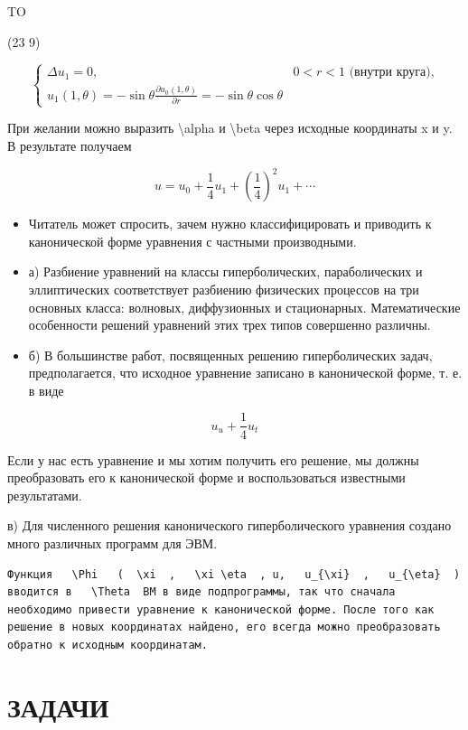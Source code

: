 \documentclass[
]{article}
\begin{document}
TO

(23 9)

\[
\begin{cases} \Delta u_{1} = 0, & 0 < r < 1 \text{ (внутри круга),} \\ u_{1}(1, \theta) = -\sin \theta \frac{\partial u_{0}(1, \theta)}{\partial r} = -\sin \theta \cos \theta \end{cases}
\]

При желании можно выразить \textbackslash alpha и \textbackslash beta
через исходные координаты x и y. В результате получаем

\[
u = u_0 + \frac{1}{4}u_1 + \left(\frac{1}{4}\right)^2 u_1 + \cdots
\]

\begin{itemize}
\item
  Читатель может спросить, зачем нужно классифицировать и приводить к
  канонической форме уравнения с частными производными.
\item
  а) Разбиение уравнений на классы гиперболических, параболических и
  эллиптических соответствует разбиению физических процессов на три
  основных класса: волновых, диффузионных и стационарных. Математические
  особенности решений уравнений этих трех типов совершенно различны.
\item
  б) В большинстве работ, посвященных решению гиперболических задач,
  предполагается, что исходное уравнение записано в канонической форме,
  т. е. в виде
\end{itemize}

\[
u_u + \frac{1}{4} u_t
\]

Если у нас есть уравнение и мы хотим получить его решение, мы должны
преобразовать его к канонической форме и воспользоваться известными
результатами.

в) Для численного решения канонического гиперболического уравнения
создано много различных программ для ЭВМ.

\begin{verbatim}
Функция   \Phi   (  \xi  ,   \xi \eta  , u,   u_{\xi}  ,   u_{\eta}  ) вводится в   \Theta  ВМ в виде подпрограммы, так что сначала необходимо привести уравнение к канонической форме. После того как решение в новых координатах найдено, его всегда можно преобразовать обратно к исходным координатам.
\end{verbatim}

\section{ЗАДАЧИ}\label{ux437ux430ux434ux430ux447ux438-2}
\end{document}
